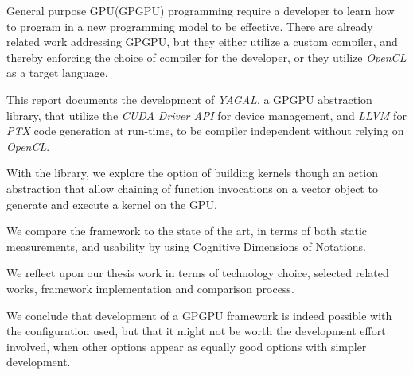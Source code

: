 General purpose GPU(GPGPU) programming require a developer to learn how to program in a new programming model to be effective. There are already related work addressing GPGPU, but they either utilize a custom compiler, and thereby enforcing the choice of compiler for the developer, or they utilize \textit{OpenCL} as a target language.

This report documents the development of \textit{YAGAL}, a GPGPU abstraction library, that utilize the \textit{CUDA Driver API} for device management, and \textit{LLVM} for \textit{PTX} code generation at run-time, to be compiler independent without relying on \textit{OpenCL}.

With the library, we explore the option of building kernels though an action abstraction that allow chaining of function invocations on a vector object to generate and execute a kernel on the GPU.

We compare the framework to the state of the art, in terms of both static measurements, and usability by using Cognitive Dimensions of Notations.

We reflect upon our thesis work in terms of technology choice, selected related works, framework implementation and comparison process.

We conclude that development of a GPGPU framework is indeed possible with the configuration used, but that it might not be worth the development effort involved, when other options appear as equally good options with simpler development.